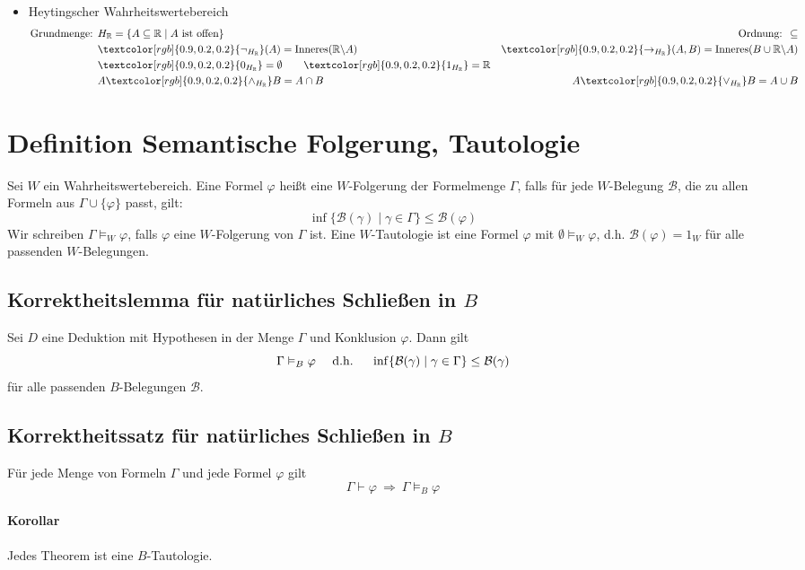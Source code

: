 \documentclass[12pt,a4paper]{report}
\newcommand{\ra}{\rightarrow}
\newcommand{\RA}{\Rightarrow}
\newcommand{\real}{\mathbb{R}}
\newcommand{\ls}{\newline\newline}
\newcommand{\define}[1]{\section{\blue{Definition #1}}}
\newcommand{\red}[1]{\textcolor[rgb]{0.9,0.2,0.2}{#1}}
\newcommand{\green}[1]{\textcolor[rgb]{0.1,0.6,0.1}{#1}}
\newcommand{\blue}[1]{\textcolor[rgb]{0.2,0.2,1}{#1}}
\begin{document}
\begin{itemize}
    \item \red{Heytingscher Wahrheitswertebereich}
    \begin{align*}
        \textnormal{Grundmenge: } & H_\real = \{A \subseteq \real \mid A \textnormal{ ist offen}\} & \textnormal{Ordnung: } \subseteq\\
        &\red{\lnot_{H_\real}}(A) = \textnormal{Inneres}(\real \backslash A) & \red{\ra_{H_\real}} (A,B) = \textnormal{Inneres}(B \cup \real \backslash A)\\
        &\red{0_{H_\real}} = \emptyset \qquad \red{1_{H_\real}} = \real\\
        &A \red{\wedge_{H_\real}} B = A \cap B  & A \red{\vee_{H_\real}} B = A \cup B
    \end{align*}
\end{itemize}

\define{Semantische Folgerung, Tautologie}
Sei $ W $ ein Wahrheitswertebereich.\newline
Eine Formel $ \varphi $ heißt eine \red{$ W $-Folgerung} der Formelmenge $ \Gamma $, falls für jede $ W $-Belegung $ \mathcal{B} $, die zu allen Formeln aus $ \Gamma \cup \{\varphi\} $ passt, gilt:
\[
    \inf\{\mathcal{B}(\gamma) \mid \gamma \in \Gamma\} \leq \mathcal{B}(\varphi)
\]
Wir schreiben \red{$ \Gamma \vDash_W \varphi $}, falls $ \varphi $ eine $ W $-Folgerung von $ \Gamma $ ist.\ls
Eine \red{$ W$-Tautologie}  ist eine Formel $ \varphi $ mit $ \emptyset \vDash_W \varphi $, d.h. $ \mathcal{B}(\varphi) = 1_W $ für alle passenden $ W$-Belegungen.

\subsection{\green{Korrektheitslemma für natürliches Schließen in $B$}}
Sei $ D $ eine Deduktion mit Hypothesen in der Menge $ \Gamma $ und Konklusion $ \varphi $. Dann gilt
\[
    \Gamma \vDash_B \varphi \quad \textnormal{ d.h. } \quad \inf\{\mathcal{B}(\gamma) \mid \gamma \in \Gamma\} \leq \mathcal{B}(\gamma)
\]
für alle passenden $ B $-Belegungen $ \mathcal{B} $.
\subsection{\green{Korrektheitssatz für natürliches Schließen in $B$}}
Für jede Menge von Formeln $ \Gamma $ und jede Formel $ \varphi $ gilt
\[
    \Gamma \vdash \varphi ~\RA~ \Gamma \vDash_B \varphi
\]
\paragraph{Korollar} Jedes Theorem ist eine $ B $-Tautologie.
\end{document}

